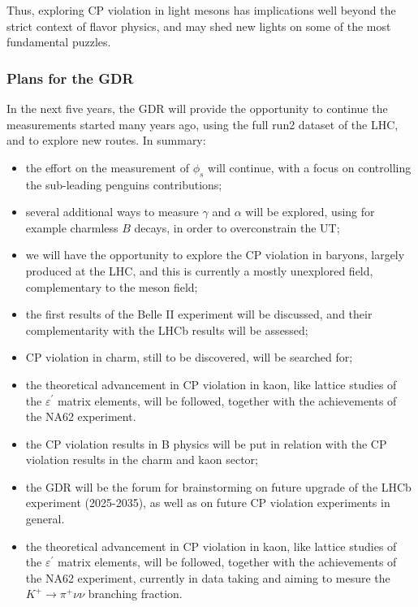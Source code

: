Thus, exploring CP violation in light mesons has implications well beyond the
strict context of flavor physics, and may shed new lights on some of the most
fundamental puzzles.





\subsubsection*{Plans for the GDR}
In the next five years, the GDR   will provide the opportunity to continue the measurements started many years ago, using the full run2 dataset of the LHC, and to explore new routes.  In summary:
\begin{itemize}
\item the effort on the measurement of $\phi_{s}$ will continue, with a focus on controlling the sub-leading penguins contributions;
\item several additional ways to measure $\gamma$ and $\alpha$ will be explored, using for example charmless $B$ decays, in order  to overconstrain the UT;
\item we will have the opportunity to explore the CP violation in baryons, largely produced at the LHC, and this is currently a mostly unexplored field, complementary to the meson field;
\item  the first results  of the Belle II experiment will be discussed, and  their complementarity with the LHCb results will be assessed;
\item CP violation in charm,  still to be discovered, will be searched for;
\item the theoretical advancement in CP violation in kaon, like  lattice studies of the $\varepsilon^{\prime}$ matrix elements, will be followed, together with the achievements of the  NA62 experiment.
\item the CP violation results in B physics will be put in relation with the CP violation results in the charm and kaon sector; 
\item the GDR will be the forum for  brainstorming on future upgrade of the LHCb experiment (2025-2035), as well as on future CP violation experiments in general.
\item the theoretical advancement in CP violation in kaon, like  lattice studies of the $\varepsilon^{\prime}$ matrix elements, will be followed, together with the achievements of the  NA62 experiment, currently in data taking and aiming to mesure the  $K^{+}%
\rightarrow\pi^{+}\nu\nu$ branching fraction.
\end{itemize}

